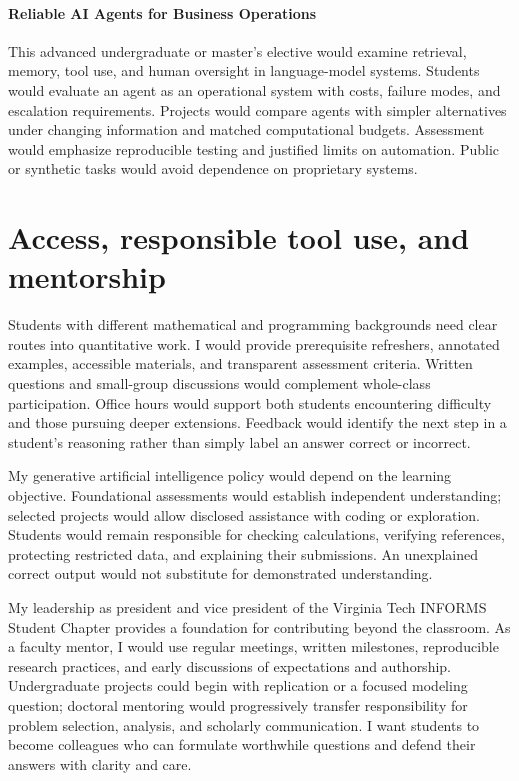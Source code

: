 \documentclass[11pt,letterpaper]{article}
\begin{document}
\paragraph{Reliable AI Agents for Business Operations}
This advanced undergraduate or master's elective would examine retrieval,
memory, tool use, and human oversight in language-model systems. Students
would evaluate an agent as an operational system with costs, failure
modes, and escalation requirements. Projects would compare agents with
simpler alternatives under changing information and matched computational
budgets. Assessment would emphasize reproducible testing and justified
limits on automation. Public or synthetic tasks would avoid dependence on
proprietary systems.

\section{Access, responsible tool use, and mentorship}

Students with different mathematical and programming backgrounds need clear
routes into quantitative work. I would provide prerequisite refreshers,
annotated examples, accessible materials, and transparent assessment
criteria. Written questions and small-group discussions would complement
whole-class participation. Office hours would support both students
encountering difficulty and those pursuing deeper extensions. Feedback
would identify the next step in a student's reasoning rather than simply
label an answer correct or incorrect.

My generative artificial intelligence policy would depend on the learning
objective. Foundational assessments would establish independent
understanding; selected projects would allow disclosed assistance with
coding or exploration. Students would remain responsible for checking
calculations, verifying references, protecting restricted data, and
explaining their submissions. An unexplained correct output would not
substitute for demonstrated understanding.

My leadership as president and vice president of the Virginia Tech INFORMS
Student Chapter provides a foundation for contributing beyond the
classroom. As a faculty mentor, I would use regular meetings, written
milestones, reproducible research practices, and early discussions of
expectations and authorship. Undergraduate projects could begin with
replication or a focused modeling question; doctoral mentoring would
progressively transfer responsibility for problem selection, analysis,
and scholarly communication. I want students to become colleagues who can
formulate worthwhile questions and defend their answers with clarity
and care.
\end{document}
